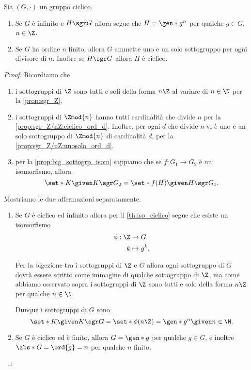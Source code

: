 \begin{corollary}
     \label{cor:sgr_gruppo_ciclico}
    Sia $(G, \cdot)$ un gruppo ciclico.
    \begin{enumerate}[label={(\roman*)}]
        \item Se $G$ è infinito e $H \sgr G$ allora segue che $H = \gen*{g^n}$ per qualche $g \in G$, $n \in \Z$.
        \item Se $G$ ha ordine $n$ finito, allora $G$ ammette uno e un solo sottogruppo per ogni divisore di $n$.
        Inoltre se $H \sgr G$ allora $H$ è ciclico.
    \end{enumerate}
\end{corollary}
\begin{proof}
    Ricordiamo che \begin{enumerate}
        \item i sottogruppi di $\Z$ sono tutti e soli della forma $n\Z$ al variare di $n \in \N$ per la \autoref{prop:sgr_Z},
        \item i sottogruppi di $\Zmod{n}$ hanno tutti cardinalità che divide $n$ per la \autoref{prop:sgr_Z/nZ:ciclico_ord_d}. Inoltre, per ogni $d$ che divide $n$ vi è uno e un solo sottogruppo di $\Zmod{n}$ di cardinalità $d$, per la \autoref{prop:sgr_Z/nZ:unosolo_ord_d}.
        \item per la \autoref{prop:big_sottogrp_isom} sappiamo che se $f : G_1 \to G_2$ è un isomorfismo, allora \[
            \set*{K \given K \sgr G_2} = \set*{f(H) \given H \sgr G_1}. 
        \]
    \end{enumerate}

    Mostriamo le due affermazioni separatamente.
    \begin{enumerate}[label={(\roman*)}]
        \item Se $G$ è ciclico ed infinito allora per il \autoref{th:iso_ciclico} segue che esiste un isomorfismo \begin{align*}
            \phi : \Z &\to G \\
            k &\mapsto g^k.
        \end{align*}

        Per la bigezione tra i sottogruppi di $\Z$ e $G$ allora ogni sottogruppo di $G$ dovrà essere scritto come immagine di qualche sottogruppo di $\Z$, ma come abbiamo osservato sopra i sottogruppi di $\Z$ sono tutti e solo della forma $n\Z$ per qualche $n \in \N$.
        
        Dunque i sottogruppi di $G$ sono \[
            \set*{K \given K \sgr G} = \set*{\phi(n\Z) = \gen*{g^n} \given n \in \N}.    
        \]
        \item Se $G$ è ciclico ed è finito, allora $G = \gen*{g}$ per qualche $g \in G$, e inoltre $\abs*{G} = \ord{g} = n$ per qualche $n$ finito.
        

\end{enumerate}
\end{proof}
